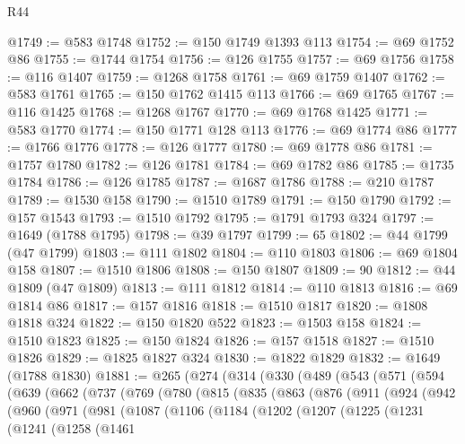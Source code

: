 \begin{lexlean}{R44}
\begin{coremodule}
@1749 := @583 @1748
@1752 := @150 @1749 @1393 @113
@1754 := @69 @1752 @86
@1755 := @1744 @1754
@1756 := @126 @1755
@1757 := @69 @1756
@1758 := @116 @1407
@1759 := @1268 @1758
@1761 := @69 @1759 @1407
@1762 := @583 @1761
@1765 := @150 @1762 @1415 @113
@1766 := @69 @1765
@1767 := @116 @1425
@1768 := @1268 @1767
@1770 := @69 @1768 @1425
@1771 := @583 @1770
@1774 := @150 @1771 @128 @113
@1776 := @69 @1774 @86
@1777 := @1766 @1776
@1778 := @126 @1777
@1780 := @69 @1778 @86
@1781 := @1757 @1780
@1782 := @126 @1781
@1784 := @69 @1782 @86
@1785 := @1735 @1784
@1786 := @126 @1785
@1787 := @1687 @1786
@1788 := @210 @1787
@1789 := @1530 @158
@1790 := @1510 @1789
@1791 := @150 @1790
@1792 := @157 @1543
@1793 := @1510 @1792
@1795 := @1791 @1793 @324
@1797 := @1649 (@1788 @1795)
@1798 := @39 @1797
@1799 := 65
@1802 := @44 @1799 (@47 @1799)
@1803 := @111 @1802
@1804 := @110 @1803
@1806 := @69 @1804 @158
@1807 := @1510 @1806
@1808 := @150 @1807
@1809 := 90
@1812 := @44 @1809 (@47 @1809)
@1813 := @111 @1812
@1814 := @110 @1813
@1816 := @69 @1814 @86
@1817 := @157 @1816
@1818 := @1510 @1817
@1820 := @1808 @1818 @324
@1822 := @150 @1820 @522
@1823 := @1503 @158
@1824 := @1510 @1823
@1825 := @150 @1824
@1826 := @157 @1518
@1827 := @1510 @1826
@1829 := @1825 @1827 @324
@1830 := @1822 @1829
@1832 := @1649 (@1788 @1830)
@1881 := @265
    (@274
      (@314
        (@330
          (@489
            (@543
              (@571
                (@594
                  (@639
                    (@662
                      (@737
                        (@769
                          (@780
                            (@815
                              (@835
                                (@863
                                  (@876
                                    (@911
                                      (@924
                                        (@942
                                          (@960
                                            (@971
                                              (@981
                                                (@1087
                                                  (@1106
                                                    (@1184
                                                      (@1202
                                                        (@1207
                                                          (@1225
                                                            (@1231
                                                              (@1241
                                                                (@1258
                                                                  (@1461

\end{coremodule}
\end{lexlean}
